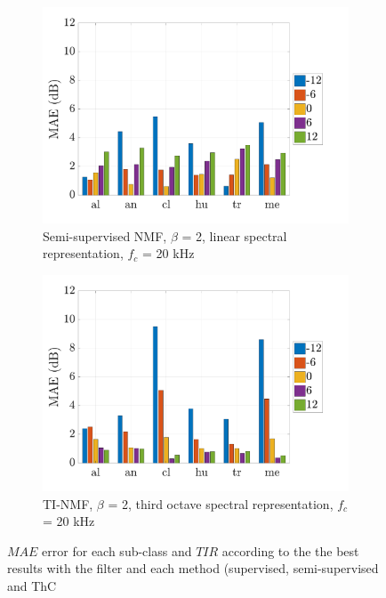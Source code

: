 \documentclass[twocolumn,a4paper,10pt]{article}
\begin{document}
\begin{figure}
    \begin{subfigure}[t]{0.45\textwidth}
        \centering
      	\includegraphics[width=\linewidth]{figures/semi-sup_bar.pdf}
        \caption{Semi-supervised NMF, $\beta$ = 2, linear spectral representation, $f_c$ = 20 kHz}
                \label{fig:TIR_class_semi}
    \end{subfigure}%
    \hfill
    \begin{subfigure}[t]{0.45\textwidth}
        \centering
        \includegraphics[width=\linewidth]{figures/THC_bar}
        \caption{TI-NMF, $\beta$ = 2, third octave spectral representation, $f_c$ = 20 kHz}
        \label{fig:TIR_class_thc}
    \end{subfigure}
    \caption{$MAE$ error for each sub-class and $TIR$ according to the the best results with the filter and each method (supervised, semi-supervised and ThC}
\end{figure}
\end{document}
